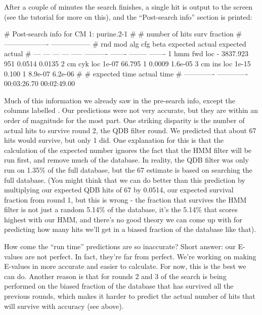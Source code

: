 After a couple of minutes the search finishes, a single hit is output
to the screen (see the tutorial for more on this), and the
``Post-search info'' section is printed:

\begin{sreoutput}
# Post-search info for CM 1: purine.2-1
#
#                              number of hits       surv fraction  
#                            -------------------  -----------------
# rnd  mod  alg  cfg   beta    expected   actual  expected   actual
# ---  ---  ---  ---  -----  ----------  -------  --------  -------
    1  hmm  fwd  loc      -    3837.923      951    0.0514   0.0135
    2   cm  cyk  loc  1e-07      66.795        1    0.0009  1.6e-05
    3   cm  ins  loc  1e-15       0.100        1   8.9e-07  6.2e-06
#
# expected time    actual time
# -------------  -------------
    00:03:26.70    00:02:49.00
\end{sreoutput}

Much of this information we already saw in the pre-search info, except
the columns labelled . Our predictions were not very
accurate, but they are within an order of magnitude for the most
part. One striking disparity is the number of actual hits to survive
round 2, the QDB filter round. We predicted that about 67 hits
would survive, but only 1 did. One explanation for this is
that the calculation of the expected number ignores the fact that the
HMM filter will be run first, and remove much of the database. In
reality, the QDB filter was only run on 1.35\% of the full
database, but the 67 estimate is based on searching the full
database. (You might think that we can do better than this prediction
by multiplying our expected QDB hits of 67 by 0.0514, our expected
survival fraction from round 1, but this is wrong - the fraction that
survives the HMM filter is not just a random 5.14\% of the database,
it's the 5.14\% that scores highest with our HMM, and there's no good
theory we can come up with for predicting how many hits we'll get in a
biased fraction of the database like that).

\begin{srefaq}{How come the  ``run time'' predictions are
  so inaccurate?} Short answer: our E-values are not perfect. In fact,
  they're far from perfect. We're working on making E-values in
   more accurate and easier to calculate. For now,
  this is the best we can do. Another reason is that for rounds 2 and
  3 of  the search is being performed on the biased
  fraction of the database that has survived all the previous rounds,
  which makes it harder to predict the actual number of hits that will
  survive with accuracy (see above).
\end{srefaq}

